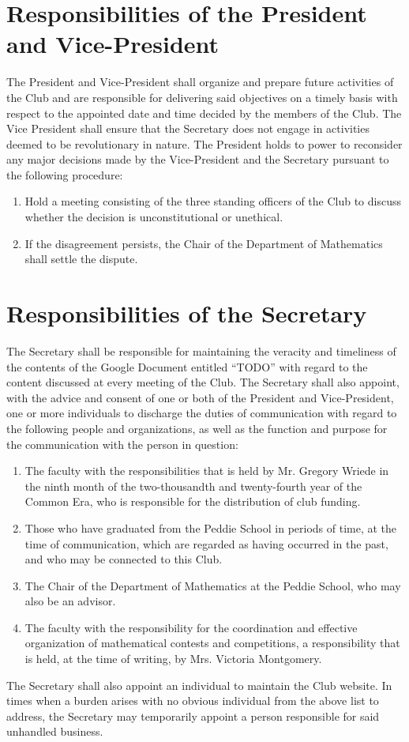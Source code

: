 \documentclass[12pt, letterpaper]{article}
\begin{document}
\section{Responsibilities of the President and Vice-President}
The President and Vice-President shall organize and prepare future activities of the Club and are responsible for delivering said objectives on a timely basis with respect to the appointed date and time decided by the members of the Club. The Vice President shall ensure that the Secretary does not engage in activities deemed to be revolutionary in nature. The President holds to power to reconsider any major decisions made by the Vice-President and the Secretary pursuant to the following procedure:
\begin{enumerate}
	\item Hold a meeting consisting of the three standing officers of the Club to discuss whether the decision is unconstitutional or unethical.
	\item If the disagreement persists, the Chair of the Department of Mathematics shall settle the dispute.
\end{enumerate}

\section{Responsibilities of the Secretary}
The Secretary shall be responsible for maintaining the veracity and timeliness of the contents of the Google Document entitled ``TODO'' with regard to the content discussed at every meeting of the Club. The Secretary shall also appoint, with the advice and consent of one or both of the President and Vice-President, one or more individuals to discharge the duties of communication with regard to the following people and organizations, as well as the function and purpose for the communication with the person in question:
\begin{enumerate}
	\item The faculty with the responsibilities that is held by Mr. Gregory Wriede in the ninth month of the two-thousandth and twenty-fourth year of the Common Era, who is responsible for the distribution of club funding.
	\item Those who have graduated from the Peddie School in periods of time, at the time of communication, which are regarded as having occurred in the past, and who may be connected to this Club.
	\item The Chair of the Department of Mathematics at the Peddie School, who may also be an advisor.
	\item The faculty with the responsibility for the coordination and effective organization of mathematical contests and competitions, a responsibility that is held, at the time of writing, by Mrs. Victoria Montgomery.
\end{enumerate}
The Secretary shall also appoint an individual to maintain the Club website. In times when a burden arises with no obvious individual from the above list to address, the Secretary may temporarily appoint a person responsible for said unhandled business.
\end{document}
